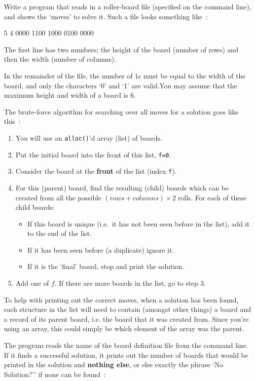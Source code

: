 \begin{exercise}
Write a program that reads in a roller-board file (specified on the command line), and shows the `moves' to solve it. Such a file looks something like~:
\begin{terminaloutput}
5 4
0000
1100
1000
0100
0000
\end{terminaloutput}

\noindent The first line has two numbers; the height of
the board (number of rows) and then the width (number of columns).

\noindent
In the remainder of the file, the number of $1$s must be equal to the width of the board, and only the characters `0' and `1' are valid.You may assume that the maximum height and width of a board is $6$.

\noindent
The brute-force algorithm for searching over all moves for a
solution goes like this~:
\begin{enumerate}
\item You will use an \verb^alloc()^'d array (list) of boards.
\item Put the initial board into the front of this list, \verb^f=0^.
\item Consider the board at the {\bf front} of the list (index \verb$f$).
\item For this (parent) board, find the resulting (child) boards 
which can be created from all the possible $(rows + columns) \times 2$ rolls. For each of these child boards:
\begin{itemize}
\item If this board is unique (i.e.\ it has not been seen before in the list), add it to the end of the list.
\item If it has been seen before (a duplicate) ignore it.
\item If it is the `final' board, stop and print the solution.
\end{itemize}
\item Add one of $f$. If there are more boards in the list, go to step $3$.
\end{enumerate}

\noindent To help with printing out the correct moves, when a solution
has been found, each structure in the list will need to contain (amongst
other things) a board and a record of its parent board, i.e. the board
that it was created from. Since you're using an array, this could simply
be which element of the array was the parent.

\noindent The program reads the name of the board definition file from
the command line.  If it finds a successful solution, it prints out the
number of boards that would be printed in the solution and {\bf nothing
else}, or else exactly the phrase `No Solution?'' if none can be found~:


\end{exercise}
